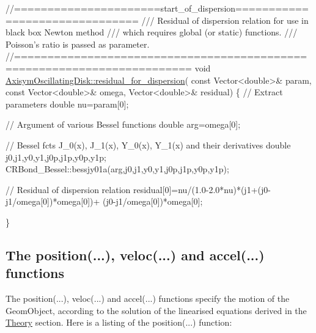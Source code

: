  
\begin{DoxyCodeInclude}
\textcolor{comment}{//======================start\_of\_dispersion===============================}
\textcolor{comment}{/// Residual of dispersion relation for use in black box Newton method}
\textcolor{comment}{}\textcolor{comment}{/// which requires global (or static) functions. }
\textcolor{comment}{}\textcolor{comment}{/// Poisson's ratio is passed as parameter.}
\textcolor{comment}{}\textcolor{comment}{//========================================================================}
\textcolor{keywordtype}{void} \hyperlink{classAxisymOscillatingDisk_ae6a90b479781b587bb8905e7bf2bba3b}{AxisymOscillatingDisk::residual\_for\_dispersion}(
 \textcolor{keyword}{const} Vector<double>& param, \textcolor{keyword}{const} Vector<double>& omega,
 Vector<double>& residual)
\{
 \textcolor{comment}{// Extract parameters}
 \textcolor{keywordtype}{double} nu=param[0];
 
 \textcolor{comment}{// Argument of various Bessel functions}
 \textcolor{keywordtype}{double} arg=omega[0];
  
 \textcolor{comment}{// Bessel fcts J\_0(x), J\_1(x), Y\_0(x), Y\_1(x) and their derivatives}
 \textcolor{keywordtype}{double} j0,j1,y0,y1,j0p,j1p,y0p,y1p;
 CRBond\_Bessel::bessjy01a(arg,j0,j1,y0,y1,j0p,j1p,y0p,y1p);
 
 \textcolor{comment}{// Residual of dispersion relation}
 residual[0]=nu/(1.0-2.0*nu)*(j1+(j0-j1/omega[0])*omega[0])+
  (j0-j1/omega[0])*omega[0];
 
\}

\end{DoxyCodeInclude}




\hypertarget{index_position}{}\subsection{The position(...), veloc(...) and accel(...) functions}\label{index_position}
The {\ttfamily position}(...), {\ttfamily veloc}(...) and {\ttfamily accel}(...) functions specify the motion of the {\ttfamily Geom\+Object}, according to the solution of the linearised equations derived in the \hyperlink{index_theory}{Theory} section. Here is a listing of the {\ttfamily position}(...) function\+:

